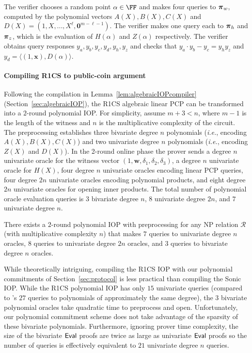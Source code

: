 The verifier chooses a random point $\alpha \in \FF$ and makes four queries to $\boldsymbol{\pi}_w$, computed by the polynomial vectors $A(X), B(X), C(X)$ and $D(X) = (1, X,...,X^\ell, \mathbf{0}^{m- \ell -1})$. The verifier makes one query each to $\boldsymbol{\pi}_h$ and $\boldsymbol{\pi}_z$, which is the evaluation of $H(\alpha)$ and $Z(\alpha)$ respectively. The verifier obtains query responses $y_a, y_b, y_c, y_d, y_h, y_z$ and checks that $y_a \cdot y_b - y_c = y_h y_z$ and $y_d = \langle (1, \mathbf{x}), D(\alpha) \rangle$. 

\paragraph{Compiling R1CS to public-coin argument} 

Following the compilation in Lemma~\ref{lem:algebraicIOPcompiler} (Section~\ref{sec:algebraicIOP}), the R1CS algebraic linear PCP can be transformed into a $2$-round polynomial IOP. For simplicity, assume $m+3 < n$, where $m-1$ is the length of the witness and $n$ is the multiplicative complexity of the circuit. The preprocessing establishes three bivariate degree $n$ polynomials (\emph{i.e.}, encoding $A(X), B(X), C(X)$) and two univariate degree $n$ polynomials (\emph{i.e.}, encoding $Z(X)$ and $D(X)$). In the 2-round online phase the prover sends a degree $n$ univariate oracle for the witness vector $(1, \mathbf{w}, \delta_1, \delta_2, \delta_3)$, a degree $n$ univariate oracle for $H(X)$, four degree $n$ univariate oracles encoding linear PCP queries, four degree $2n$ univariate oracles encoding polynomial products, and eight degree $2n$ univariate oracles for opening inner products. The total number of polynomial oracle evaluation queries is $3$ bivariate degree $n$, $8$ univariate degree $2n$, and $7$ univariate degree $n$.

\begin{theorem}
There exists a $2$-round polynomial IOP with preprocessing for any NP relation $\mathcal{R}$ (with multiplicative complexity $n$) that makes $7$ queries to univariate degree $n$ oracles, $8$ queries to univariate degree $2n$ oracles, and $3$ queries to bivariate degree $n$ oracles.  
\end{theorem}
 
While theoretically intriguing, compiling the R1CS IOP with our polynomial commitments of Section~\ref{sec:protocol} is less practical than compiling the \textsf{Sonic} IOP. While the R1CS polynomial IOP has only $15$ univariate queries (compared to 's $27$ queries to polynomials of approximately the same degree), the $3$ bivariate polynomial oracles take quadratic time to preprocess and open. Unfortunately, our polynomial commitment scheme does not take advantage of the sparsity of these bivariate polynomials. Furthermore, ignoring prover time complexity, the size of the bivariate $\textsf{{Eval}}$ proofs are twice as large as univariate $\textsf{{Eval}}$ proofs so the number of queries is effectively equivalent to $21$ univariate degree $n$ queries. 




